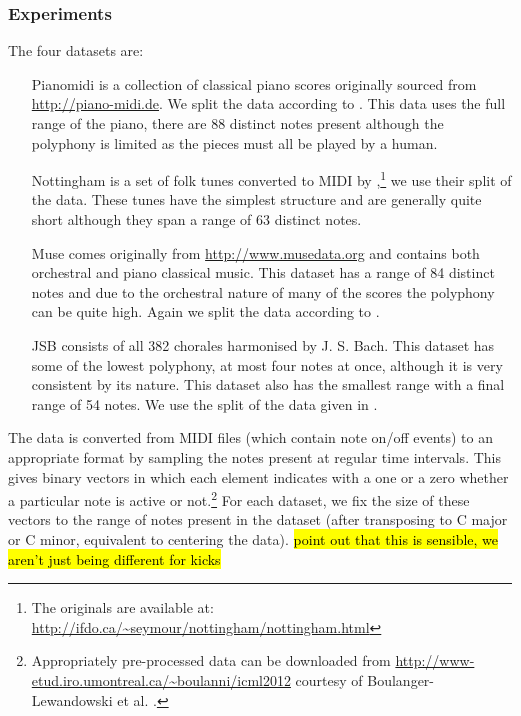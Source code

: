 \subsubsection{Experiments}
The four datasets are:
\begin{itemize}
\item[Pianomidi] {
	is a collection of classical piano scores originally sourced from
	\url{http://piano-midi.de}. We split the data according to
	\autocite{Poliner2007}. This data uses the full range of the piano,
	there are 88 distinct notes present although the polyphony is limited
	as the pieces must all be played by a human.}
\item[Nottingham] {
	is a set of folk tunes converted to MIDI by 
	\autocite{Boulanger-Lewandowski2012},\footnote{
	The originals are available at: \url{http://ifdo.ca/~seymour/nottingham/nottingham.html}}
	we use their split of the data. These tunes have the simplest structure and are
	generally quite short although they span a range of 63 distinct notes.}
\item[Muse] {
	comes originally from \url{http://www.musedata.org} and contains both orchestral and
	piano classical music. This dataset has a range of 84 distinct notes and due to the
	orchestral nature of many of the scores the polyphony can be quite high. Again we
	split the data according to \autocite{Boulanger-Lewandowski2012}.}
\item[JSB] {
	consists of all 382 chorales harmonised by J. S. Bach. This dataset has some of the
	lowest polyphony, at most four notes at once, although it is very consistent by its
	nature. This dataset also has the smallest range with a final range of 54 notes.
	We use the split of the data given in \autocite{Allan2004}.}
\end{itemize}

The data is converted from MIDI files (which contain note on/off events) to
an appropriate format by sampling the notes present at regular time intervals.
This gives binary vectors in which each element indicates with a one or a zero whether
a particular note is active or not.\footnote{Appropriately pre-processed data can
be downloaded from \url{http://www-etud.iro.umontreal.ca/~boulanni/icml2012}
courtesy of Boulanger-Lewandowski et al. \autocite{Boulanger-Lewandowski2012}.}
For each dataset, we fix the size of these vectors to the range of notes present in the
dataset (after transposing to C major or C minor, equivalent to centering the data).
\hl{point out that this is sensible, we aren't just being different for kicks}

